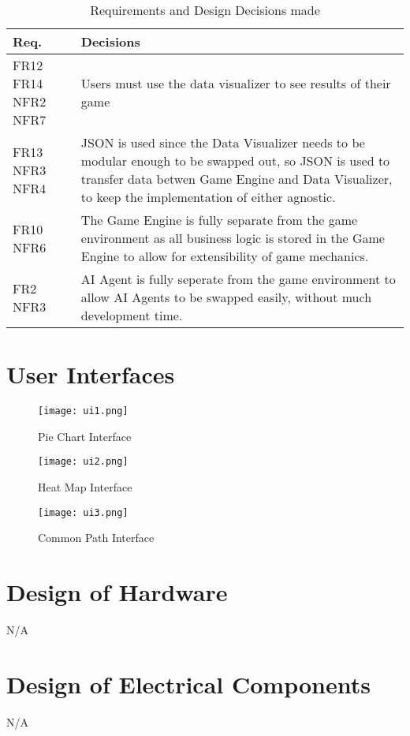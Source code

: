 \documentclass[12pt, titlepage]{article}
\begin{document}
\begin{table}[H]
\centering 
\begin{tabular}{p{} p{}}
\toprule
\textbf{Req.} & \textbf{Decisions}\\
\midrule
FR12 FR14 NFR2 NFR7 & Users must use the data visualizer to see results of their game \\
FR13 NFR3 NFR4 & JSON is used since the Data Visualizer needs to be modular enough to be swapped out, so JSON is used to transfer data betwen Game Engine and Data Visualizer, to keep the implementation of either agnostic. \\ 
FR10 NFR6 & The Game Engine is fully separate from the game environment as all business logic is stored in the Game Engine to allow for extensibility of game mechanics. \\ 
FR2 NFR3 & AI Agent is fully seperate from the game environment to allow AI Agents to be swapped easily, without much development time. \\ 

\hline
\end{tabular}
\caption{Requirements and Design Decisions made}
\label{TblRT2}
\end{table}


\section{User Interfaces}
\begin{figure}[H]
    \centering
    \texttt{[image: ui1.png]}
    \caption{Pie Chart Interface}
    \label{fig:piechart}
\end{figure}
\begin{figure}[H]
    \centering
    \texttt{[image: ui2.png]}
    \caption{Heat Map Interface}
    \label{fig:heatmap}
\end{figure}
\begin{figure}[H]
    \centering
    \texttt{[image: ui3.png]}
    \caption{Common Path Interface}
    \label{fig:commonpath}
\end{figure}

\newpage
\section{Design of Hardware}
N/A
\section{Design of Electrical Components}
N/A
\end{document}
